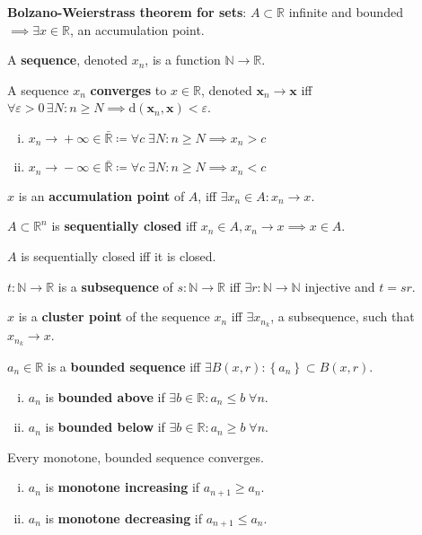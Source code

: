 \documentclass[letterpaper,11pt]{amsart}
\newcommand{\dist}[2]{\textrm{d}\left( {#1}, {#2} \right)}
\newcommand{\ballo}[2]{B\left( {#1}, {#2} \right)}
\newcommand{\naturals}{\mathbb{N}}
\newcommand{\reals}{\mathbb{R}}
\newcommand{\keyphrase}[1]{\textbf{#1}}
\begin{document}
\keyphrase{Bolzano-Weierstrass theorem for sets}: $A \subset \reals{}$ infinite
and bounded $\implies \exists x \in \reals{}$, an accumulation point.

A \keyphrase{sequence}, denoted $x_{n}$, is a function $\naturals{}\to\reals{}$.

A sequence $x_{n}$ \keyphrase{converges} to $x\in\reals$, 
denoted $\mathbf{x}_{n}\to{}\mathbf{x}$ iff
$\forall\varepsilon>0\,\exists{}N:n\geq{}N
\implies\dist{\mathbf{x}_{n}}{\mathbf{x}}<\varepsilon$.
\begin{enumerate}[(i)]
    \item $x_{n}\to{}+\infty\in\bar{\reals} \coloneqq
        \forall{}c\;\exists{}N:n\geq{}N\implies{}x_{n}>{}c$
    \item $x_{n}\to{}-\infty\in\bar{\reals} \coloneqq
        \forall{}c\;\exists{}N:n\geq{}N\implies{}x_{n}<{}c$
\end{enumerate}

$x$ is an \keyphrase{accumulation point} of $A$, iff
$\exists{}x_{n}\in{}A:x_{n}\to{x}$.

$A\subset\reals^{n}$ is \keyphrase{sequentially closed} iff
$x_{n}\in{}A, x_{n}\to{}x \implies x\in{}A$.

$A$ is sequentially closed iff it is closed.

$t:\naturals{}\to\reals{}$ is a \keyphrase{subsequence} of
$s:\naturals{}\to\reals{}$
iff $\exists r:\naturals{}\to\naturals{}$ injective and $t = sr$.

$x$ is a \keyphrase{cluster point} of the sequence $x_{n}$ iff
$\exists x_{n_{k}}$, a subsequence, such that $x_{n_{k}}\to{}x$.

$a_{n}\in\reals{}$ is a \keyphrase{bounded sequence} iff
$\exists \ballo{x}{r}: \left\{ a_{n} \right\}\subset\ballo{x}{r}$.
\begin{enumerate}[(i)]
    \item $a_{n}$ is \keyphrase{bounded above} if
        $\exists b\in\reals:a_{n}\leq{}b\;\forall{}n$.
    \item $a_{n}$ is \keyphrase{bounded below} if
        $\exists b\in\reals:a_{n}\geq{}b\;\forall{}n$.
\end{enumerate}

Every monotone, bounded sequence converges.
\begin{enumerate}[(i)]
    \item $a_{n}$ is \keyphrase{monotone increasing} if $a_{n+1}\geq{}a_{n}$.
    \item $a_{n}$ is \keyphrase{monotone decreasing} if $a_{n+1}\leq{}a_{n}$.
\end{enumerate}
\end{document}
